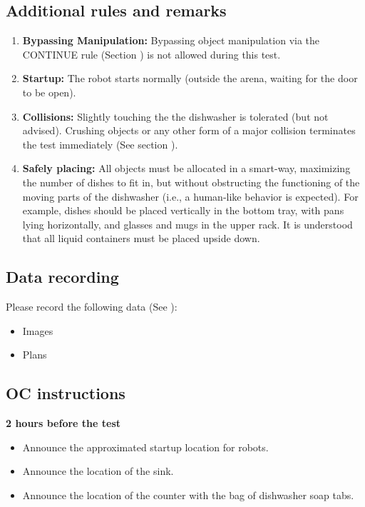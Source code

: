 \subsection{Additional rules and remarks}
\begin{enumerate}
	\item \textbf{Bypassing Manipulation:} Bypassing object manipulation via the CONTINUE rule (Section ) is not allowed during this test.

	\item \textbf{Startup:} The robot starts normally (outside the arena, waiting for the door to be open). 

	\item \textbf{Collisions:} Slightly touching the the dishwasher is tolerated (but not advised). Crushing objects or any other form of a major collision terminates the test immediately (See section ).

	\item \textbf{Safely placing:} All objects must be allocated in a smart-way, maximizing the number of dishes to fit in, but without obstructing the functioning of the moving parts of the dishwasher (i.e., a human-like behavior is expected). For example, dishes should be placed vertically in the bottom tray, with pans lying horizontally, and glasses and mugs in the upper rack. It is understood that all liquid containers must be placed upside down.
\end{enumerate}

\subsection{Data recording}
Please record the following data (See ):
\begin{itemize}
	\item Images
	\item Plans
\end{itemize}

\subsection{OC instructions}

\textbf{2 hours before the test}
\begin{itemize}
    \item Announce the approximated startup location for robots.
    \item Announce the location of the sink.
    \item Announce the location of the counter with the bag of dishwasher soap tabs.
\end{itemize}

